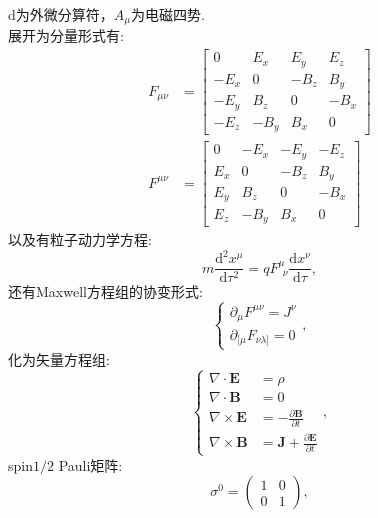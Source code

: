 $\mathrm d$为外微分算符，$A_\mu$为电磁四势.\\
展开为分量形式有: 
\begin{subequations}
    \begin{align}
        F_{\mu\nu} &= \begin{bmatrix}
            0 & E_x & E_y & E_z \\
            -E_x & 0 & -B_z & B_y \\
            -E_y & B_z & 0 & -B_x \\
            -E_z & -B_y & B_x & 0
        \end{bmatrix}\\
        F^{\mu\nu} &= \begin{bmatrix}
            0 & -E_x & -E_y & -E_z \\
            E_x & 0 & -B_z & B_y \\
            E_y & B_z & 0 & -B_x \\
            E_z & -B_y & B_x & 0
        \end{bmatrix}
    \end{align}
\end{subequations}
以及有粒子动力学方程:
\begin{equation}
    m\frac{\mathrm d^2x^\mu}{\mathrm d\tau^2}=qF^\mu_{~~\nu}\frac{\mathrm dx^\nu}{\mathrm d\tau},
\end{equation}
还有Maxwell方程组的协变形式:
\begin{equation}
    \begin{cases}
        \partial_\mu F^{\mu\nu} = J^\nu\\
        \partial_{[\mu} F_{\nu\lambda]} = 0
    \end{cases},
\end{equation}
化为矢量方程组:
\begin{equation}
    \begin{cases}
        \nabla \cdot \mathbf{E} &= \rho \\
        \nabla \cdot \mathbf{B} &= 0 \\
        \nabla \times \mathbf{E} &= -\frac{\partial \mathbf{B}}{\partial t} \\
        \nabla \times \mathbf{B} &= \mathbf{J} + \frac{\partial \mathbf{E}}{\partial t}
    \end{cases},
\end{equation}
spin$1/2$ Pauli矩阵:
\begin{equation}
    \sigma^0=\begin{pmatrix}
        1 & 0 \\
        0 & 1
    \end{pmatrix},
\end{equation}
